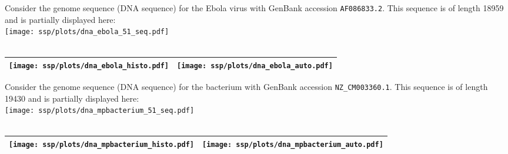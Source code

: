 \begin{example}
\label{ex:dna_ebola}
Consider the genome sequence (DNA sequence) for the Ebola virus with GenBank accession \lstinline{AF086833.2}.
This sequence is of length 18959 and is partially displayed here:
  \\\texttt{[image: ssp/plots/dna\_ebola\_51\_seq.pdf]}\\
     \\\begin{tabular}{|>{\scs}c|>{\scs}c|}
          \hline
          \texttt{[image: ssp/plots/dna\_ebola\_histo.pdf]}%
         &\texttt{[image: ssp/plots/dna\_ebola\_auto.pdf]}
        \\\hline
     \end{tabular}
\end{example}

\begin{example}
\label{ex:dna_mpbacterium}
Consider the genome sequence (DNA sequence) for the bacterium 
with GenBank accession \lstinline{NZ_CM003360.1}.
This sequence is of length 19430 and is partially displayed here:
  \\\texttt{[image: ssp/plots/dna\_mpbacterium\_51\_seq.pdf]}\\
     \\\begin{tabular}{|>{\scs}c|>{\scs}c|}
          \hline
          \texttt{[image: ssp/plots/dna\_mpbacterium\_histo.pdf]}%
         &\texttt{[image: ssp/plots/dna\_mpbacterium\_auto.pdf]}
        \\\hline
     \end{tabular}
\end{example}


